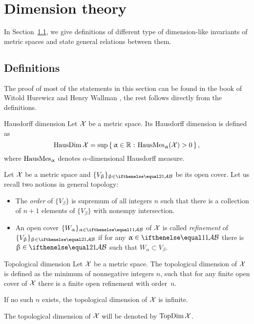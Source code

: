 \chapter{Dimension theory}

In Section~\ref{sec:prelim:dim}, we give definitions of different type of dimension-like invariants of metric spaces and state general relations between them.


\section{Definitions}\label{sec:prelim:dim}

The proof of most of the statements in this section can be found in the book of Witold Hurewicz and Henry Wallman \cite{top-dim}, 
the rest follows directly from the definitions.

\begin{thm}{Hausdorff dimension}
\label{def:HausDim}
Let $\mathcal{X}$ be a metric space. 
Its Hausdorff dimension is defined as
\[\HausDim\spc{X}=\sup\set{\alpha\in\RR}{\HausMes_\alpha(\spc{X})>0},\]
 where $\mathop{\rm HausMes}\nolimits_\upalpha$ denotes $\alpha$-dimensional Hausdorff measure. %
\end{thm}

Let $\mathcal{X}$ be a metric space and $\{V_\beta\}_{\beta\in\IndexSet[2]}$
 be its open cover.
Let us recall two notions in general topology:
\begin{itemize}
\item The \emph{order} of $\{V_\beta\}$ is supremum of all integers $n$ such that there is a collection of $n+1$ elements of $\{V_\beta\}$ with nonempy intersection.
\item An open cover $\{W_\alpha\}_{\alpha\in\IndexSet}$ of $\mathcal{X}$ is called \emph{refinement} of  $\{V_\beta\}_{\beta\in\IndexSet[2]}$ if for any $\alpha\in\IndexSet$ there is $\beta\in\IndexSet[2]$ such that $W_\alpha\subset V_\beta$.
\end{itemize}

\begin{thm}{Topological dimension}
\label{def:TopDim}
Let $\mathcal{X}$ be a metric space. 
The topological dimension of $\mathcal{X}$ is defined as the minimum of nonnegative integers $n$, 
such that for any finite open cover of $\mathcal{X}$ there is a finite open refinement with order~$n$.

If no such $n$ exists, the topological dimension of $\mathcal{X}$ is infinite.

The topological dimension of $\mathcal{X}$ will be denoted by $\mathop{\rm TopDim}\nolimits\mathcal{X}$.
\end{thm}

